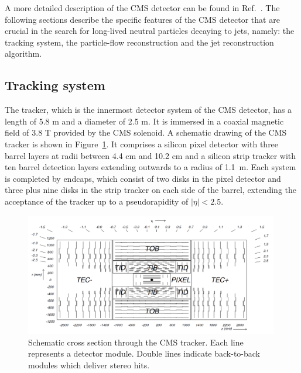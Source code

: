 A more detailed description of the CMS detector can be found in Ref.~\cite{Chatrchyan:2008zzk}.  
The following sections describe the specific features of the CMS detector
that are crucial in the search for long-lived neutral particles decaying to jets, namely: the
tracking system, the particle-flow reconstruction and the jet reconstruction algorithm.

\subsection{Tracking system}
\label{subsec:trackreco}

The tracker, which is the innermost detector system of the CMS detector, has a length
of 5.8 m and a
diameter of 2.5 m. It is immersed in a coaxial magnetic field of 3.8 T
provided by the CMS solenoid. A schematic drawing of the CMS tracker is shown in
Figure~\ref{fig:tracker}. It comprises a silicon pixel detector with three barrel layers at radii
between 4.4 cm and 10.2 cm and a silicon strip tracker with ten barrel
detection layers extending outwards to a radius of 1.1~m. Each system is
completed by endcaps, which consist of two disks in the pixel detector and three
plus nine disks in the strip tracker on each side of the barrel, extending
the acceptance of the tracker up to a pseudorapidity of $|\eta| < 2.5$.
\begin{figure}[!h]
\centering
\includegraphics[width=0.99\textwidth]{plots/intro/tracker.png}
\caption{Schematic cross section through the CMS tracker. Each line represents a
detector module. Double lines indicate back-to-back modules which deliver stereo
hits.\label{fig:tracker}}
\end{figure}

